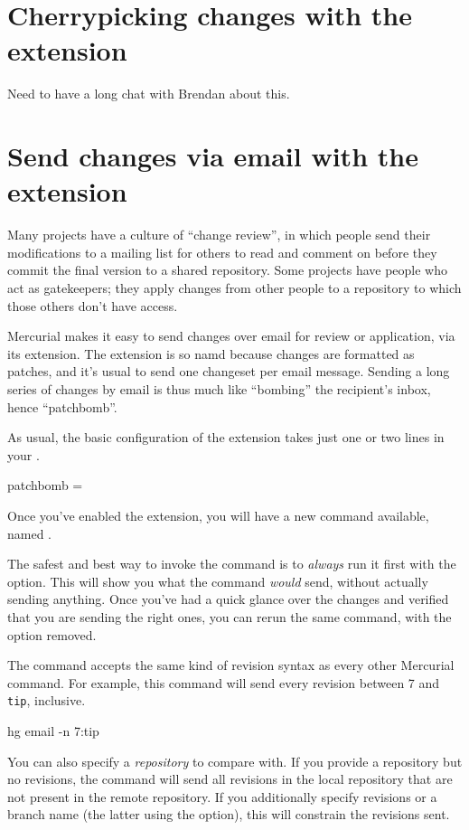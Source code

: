 \section{Cherrypicking changes with the  extension}
\label{sec:hgext:transplant}

Need to have a long chat with Brendan about this.

\section{Send changes via email with the  extension}
\label{sec:hgext:patchbomb}

Many projects have a culture of ``change review'', in which people
send their modifications to a mailing list for others to read and
comment on before they commit the final version to a shared
repository.  Some projects have people who act as gatekeepers; they
apply changes from other people to a repository to which those others
don't have access.

Mercurial makes it easy to send changes over email for review or
application, via its  extension.  The extension is so
namd because changes are formatted as patches, and it's usual to send
one changeset per email message.  Sending a long series of changes by
email is thus much like ``bombing'' the recipient's inbox, hence
``patchbomb''.

As usual, the basic configuration of the  extension
takes just one or two lines in your \hgrc.
\begin{codesample2}
  [extensions]
  patchbomb =
\end{codesample2}
Once you've enabled the extension, you will have a new command
available, named .

The safest and best way to invoke the 
command is to \emph{always} run it first with the
 option.  This will show you what the
command \emph{would} send, without actually sending anything.  Once
you've had a quick glance over the changes and verified that you are
sending the right ones, you can rerun the same command, with the
 option removed.

The  command accepts the same kind of
revision syntax as every other Mercurial command.  For example, this
command will send every revision between 7 and \texttt{tip},
inclusive.
\begin{codesample2}
  hg email -n 7:tip
\end{codesample2}
You can also specify a \emph{repository} to compare with.  If you
provide a repository but no revisions, the 
command will send all revisions in the local repository that are not
present in the remote repository.  If you additionally specify
revisions or a branch name (the latter using the
 option), this will constrain the
revisions sent.

